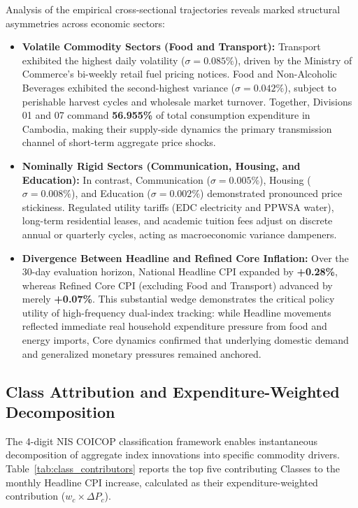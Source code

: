 \hs Analysis of the empirical cross-sectional trajectories reveals marked structural asymmetries across economic sectors:
\begin{itemize}
    \item \textbf{Volatile Commodity Sectors (Food and Transport):} Transport exhibited the highest daily volatility ($\sigma = 0.085\%$), driven by the Ministry of Commerce's bi-weekly retail fuel pricing notices. Food and Non-Alcoholic Beverages exhibited the second-highest variance ($\sigma = 0.042\%$), subject to perishable harvest cycles and wholesale market turnover. Together, Divisions 01 and 07 command \textbf{56.955\%} of total consumption expenditure in Cambodia, making their supply-side dynamics the primary transmission channel of short-term aggregate price shocks.
    \item \textbf{Nominally Rigid Sectors (Communication, Housing, and Education):} In contrast, Communication ($\sigma = 0.005\%$), Housing ($\sigma = 0.008\%$), and Education ($\sigma = 0.002\%$) demonstrated pronounced price stickiness. Regulated utility tariffs (EDC electricity and PPWSA water), long-term residential leases, and academic tuition fees adjust on discrete annual or quarterly cycles, acting as macroeconomic variance dampeners.
    \item \textbf{Divergence Between Headline and Refined Core Inflation:} Over the 30-day evaluation horizon, National Headline CPI expanded by \textbf{+0.28\%}, whereas Refined Core CPI (excluding Food and Transport) advanced by merely \textbf{+0.07\%}. This substantial wedge demonstrates the critical policy utility of high-frequency dual-index tracking: while Headline movements reflected immediate real household expenditure pressure from food and energy imports, Core dynamics confirmed that underlying domestic demand and generalized monetary pressures remained anchored.
\end{itemize}

\subsection{Class Attribution and Expenditure-Weighted Decomposition}
\hs The 4-digit NIS COICOP classification framework enables instantaneous decomposition of aggregate index innovations into specific commodity drivers. Table~\ref{tab:class_contributors} reports the top five contributing Classes to the monthly Headline CPI increase, calculated as their expenditure-weighted contribution ($w_c \times \Delta P_c$).

